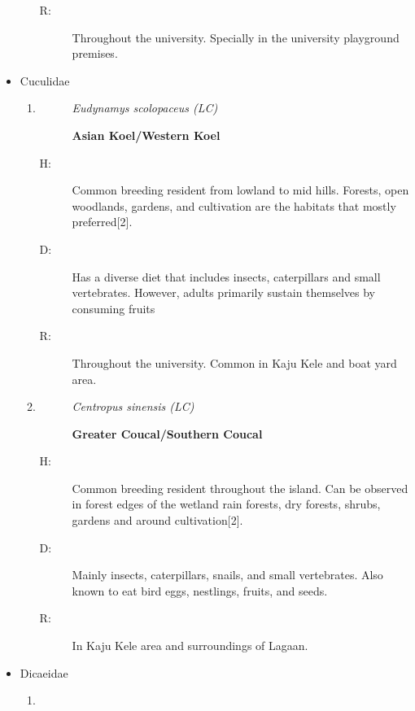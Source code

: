 \begin{itemize}
\begin{enumerate}
\begin{description}
\item[R: ]%
Throughout the university. Specially in the university playground premises. %
\end{description}%
\end{enumerate}%
\item%
Cuculidae%
\begin{enumerate}%
\item%
\begin{description}%
\item[]%
\textit{Eudynamys scolopaceus (LC)}%
\item[]%
\textbf{Asian Koel/Western Koel}%
\end{description}%
\begin{description}%
\item[H: ]%
Common breeding resident from lowland to mid hills. Forests, open woodlands, gardens, and cultivation are the habitats that mostly preferred{[}2{]}.%
\item[D: ]%
Has a diverse diet that includes insects, caterpillars and small vertebrates. However, adults primarily sustain themselves by consuming fruits%
\item[R: ]%
Throughout the university. Common in Kaju Kele and boat yard area.%
\end{description}%
\item%
\begin{description}%
\item[]%
\textit{Centropus sinensis (LC)}%
\item[]%
\textbf{Greater Coucal/Southern Coucal}%
\end{description}%
\begin{description}%
\item[H: ]%
Common breeding resident throughout the island. Can be observed in forest edges of the wetland rain forests, dry forests, shrubs, gardens and around cultivation{[}2{]}.%
\item[D: ]%
Mainly insects, caterpillars, snails, and small vertebrates. Also known to eat bird eggs, nestlings, fruits, and seeds.%
\item[R: ]%
In Kaju Kele area and surroundings of Lagaan.%
\end{description}%
\end{enumerate}%
\item%
Dicaeidae%
\begin{enumerate}%
\item%
\begin{description}%
\item[]%

\end{description}
\end{enumerate}
\end{itemize}
